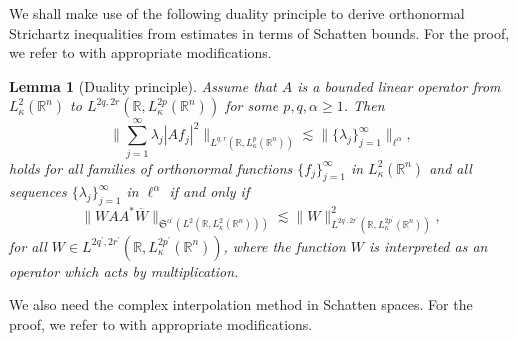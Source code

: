\documentclass[a4paper,11pt, reqno]{amsart}
\numberwithin{equation}{section}
\theoremstyle{plain}
\newtheorem{lemma}[theorem]{Lemma}
\theoremstyle{definition}
\theoremstyle{remark}
\begin{document}
 We shall make use of the following duality principle to derive orthonormal Strichartz inequalities from estimates in terms of Schatten bounds. For the proof, we refer to \cite[Lemma 3]{FS} with appropriate modifications.
 \begin{lemma}[Duality principle]\label{duality-principle} Assume that $A$ is a bounded linear operator from $L_\kappa^2(\mathbb{R}^n)$ to $L^{2q,2r}(\mathbb{R}, L_\kappa^{2p}(\mathbb{R}^n))$ for some $p,q,\alpha\geq 1$. Then 
         \begin{equation*}
			\bigg\|\sum_{j=1}^\infty \lambda_j|A f_j|^2\bigg\|_{L^{q,r}(\mathbb{R}, L_\kappa^{p}(\mathbb{R}^n))}\lesssim \|\{\lambda_j\}^\infty_{j=1}\|_{\ell^{\alpha}} ,
		\end{equation*}	
  holds for all families of orthonormal functions $\{f_j\}_{j=1}^\infty$ in $L_\kappa^2(\mathbb{R}^n)$ and all sequences $\{\lambda_j\}^\infty_{j=1}$ in $\ell^{\alpha}$ if and only if
		\begin{equation*}
	\big\|WAA^*\overline{W}\big\|_{\mathfrak{S}^{\alpha^\prime}(L^2(\mathbb{R}, L_\kappa^2(\mathbb{R}^n)))}\lesssim \big\|W\big\|^2_{L^{2q^\prime,2r^\prime}(\mathbb{R}, L_\kappa^{2p^\prime}(\mathbb{R}^n))},
		\end{equation*}
  for all $W\in L^{2q^\prime,2r^\prime}(\mathbb{R}, L_\kappa^{2p^\prime}(\mathbb{R}^n))$, where the function $W$ is interpreted as an operator which acts by multiplication.
	\end{lemma}
We also need the complex interpolation method in Schatten spaces. For the proof, we refer to \cite[Propostion 1]{FS} with appropriate modifications.
\end{document}
